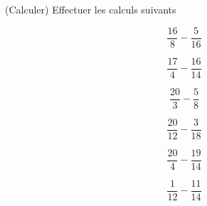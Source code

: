  (Calculer) Effectuer les calculs suivants

\begin{multicols}{6}
$$\dfrac{16}{8}-\dfrac{5}{16}$$

$$\dfrac{17}{4}-\dfrac{16}{14}$$

$$\dfrac{20}{3}-\dfrac{5}{8}$$

$$\dfrac{20}{12}-\dfrac{3}{18}$$

$$\dfrac{20}{4}-\dfrac{19}{14}$$

$$\dfrac{1}{12}-\dfrac{11}{14}$$

\end{multicols}